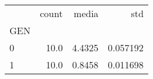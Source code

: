 \begin{tabular}{lrrr}
\toprule
{} &  count &   media &       std \\
GEN &        &         &           \\
\midrule
0   &   10.0 &  4.4325 &  0.057192 \\
1   &   10.0 &  0.8458 &  0.011698 \\
\bottomrule
\end{tabular}
